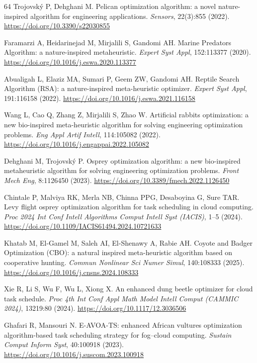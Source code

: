 \documentclass[pdflatex,onecolumn,sn-mathphys-num]{sn-jnl}
\begin{document}
\begin{thebibliography}{64}
Trojovsk\'{y} P, Dehghani M. Pelican optimization algorithm: a novel nature-inspired algorithm for engineering applications. \textit{Sensors}, 22(3):855 (2022). \url{https://doi.org/10.3390/s22030855}

Faramarzi A, Heidarinejad M, Mirjalili S, Gandomi AH. Marine Predators Algorithm: a nature-inspired metaheuristic. \textit{Expert Syst Appl}, 152:113377 (2020). \url{https://doi.org/10.1016/j.eswa.2020.113377}

Abualigah L, Elaziz MA, Sumari P, Geem ZW, Gandomi AH. Reptile Search Algorithm (RSA): a nature-inspired meta-heuristic optimizer. \textit{Expert Syst Appl}, 191:116158 (2022). \url{https://doi.org/10.1016/j.eswa.2021.116158}

Wang L, Cao Q, Zhang Z, Mirjalili S, Zhao W. Artificial rabbits optimization: a new bio-inspired meta-heuristic algorithm for solving engineering optimization problems. \textit{Eng Appl Artif Intell}, 114:105082 (2022). \url{https://doi.org/10.1016/j.engappai.2022.105082}

Dehghani M, Trojovsk\'{y} P. Osprey optimization algorithm: a new bio-inspired metaheuristic algorithm for solving engineering optimization problems. \textit{Front Mech Eng}, 8:1126450 (2023). \url{https://doi.org/10.3389/fmech.2022.1126450}

Chintale P, Malviya RK, Merla NB, Chinna PPG, Desaboyina G, Sure TAR. Levy flight osprey optimization algorithm for task scheduling in cloud computing. \textit{Proc 2024 Int Conf Intell Algorithms Comput Intell Syst (IACIS)}, 1--5 (2024). \url{https://doi.org/10.1109/IACIS61494.2024.10721633}

Khatab M, El-Gamel M, Saleh AI, El-Shenawy A, Rabie AH. Coyote and Badger Optimization (CBO): a natural inspired meta-heuristic algorithm based on cooperative hunting. \textit{Commun Nonlinear Sci Numer Simul}, 140:108333 (2025). \url{https://doi.org/10.1016/j.cnsns.2024.108333}

Xie R, Li S, Wu F, Wu L, Xiong X. An enhanced dung beetle optimizer for cloud task schedule. \textit{Proc 4th Int Conf Appl Math Model Intell Comput (CAMMIC 2024)}, 13219:80 (2024). \url{https://doi.org/10.1117/12.3036506}

Ghafari R, Mansouri N. E-AVOA-TS: enhanced African vultures optimization algorithm-based task scheduling strategy for fog--cloud computing. \textit{Sustain Comput Inform Syst}, 40:100918 (2023). \url{https://doi.org/10.1016/j.suscom.2023.100918}


\end{thebibliography}
\end{document}
